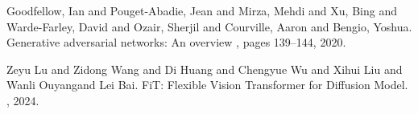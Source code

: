 \documentclass{article}
\begin{document}
\begin{thebibliography}{}
Goodfellow, Ian and Pouget-Abadie, Jean and Mirza, Mehdi and Xu, Bing and Warde-Farley, David and Ozair, Sherjil and Courville, Aaron and Bengio, Yoshua.
\newblock Generative adversarial networks: An overview
, pages 139--144, 2020.

Zeyu Lu and Zidong Wang and Di Huang and Chengyue Wu and Xihui Liu and Wanli Ouyangand Lei Bai.
\newblock FiT: Flexible Vision Transformer for Diffusion Model.
, 2024.

\end{thebibliography}
\end{document}
